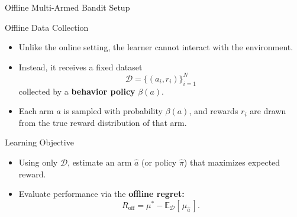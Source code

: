 \documentclass[aspectratio=169]{beamer}
\begin{document}
\begin{frame}{Offline Multi-Armed Bandit Setup}

\begin{block}{Offline Data Collection}
\begin{itemize}
    \item Unlike the online setting, the learner cannot interact with the environment.
    \item Instead, it receives a fixed dataset
    \[
    \mathcal{D} = \{(a_i, r_i)\}_{i=1}^{N}
    \]
    collected by a \textbf{behavior policy} $\beta(a)$.
    \item Each arm $a$ is sampled with probability $\beta(a)$, and rewards $r_i$ are drawn from the true reward distribution of that arm.
\end{itemize}
\end{block}

\pause
\begin{block}{Learning Objective}
\begin{itemize}
    \item Using only $\mathcal{D}$, estimate an arm $\hat{a}$ (or policy $\hat{\pi}$) that maximizes expected reward.
    \item Evaluate performance via the \textbf{offline regret:}
    \[
    R_{\text{off}} = \mu^* - \mathbb{E}_{\mathcal{D}}[\,\mu_{\hat{a}}\,].
    \]
\end{itemize}
\end{block}

\end{frame}
\end{document}
